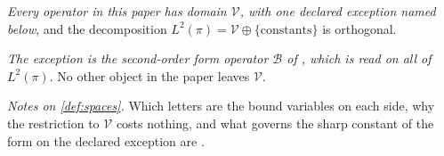 \begin{definition}
\emph{Every operator in this paper has domain $\mathcal V$, with one declared exception named below}, and
the decomposition $L^{2}(\pi)=\mathcal V\oplus\{\text{constants}\}$ is orthogonal.

\emph{The exception is the second-order form operator $\mathcal B$ of , which is read on
all of $L^{2}(\pi)$}. No other object in the paper leaves $\mathcal V$.
\end{definition}

\noindent\emph{Notes on \cref{def:spaces}.} Which letters are the bound variables on each side, why the
restriction to $\mathcal V$ costs nothing, and what governs the sharp constant of the form on the declared
exception are .


